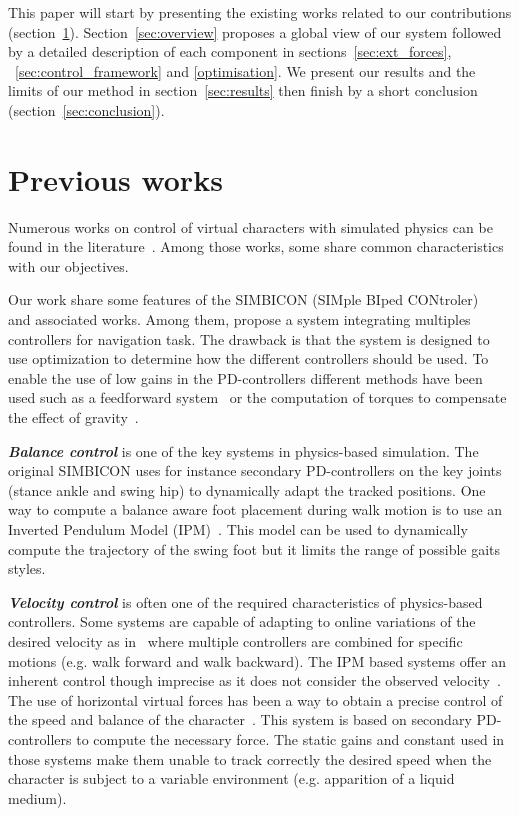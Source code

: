 \documentclass[conference]{acmsiggraph}
\begin{document}
This paper will start by presenting the existing works related to our contributions (section~\ref{sec:previous_works}). Section~\ref{sec:overview} proposes a global view of our system followed by a detailed description of each component in sections~\ref{sec:ext_forces}, ~\ref{sec:control_framework} and \ref{optimisation}. We present our results and the limits of our method in section~\ref{sec:results} then finish by a short conclusion (section~\ref{sec:conclusion}).
 
\section{Previous works}
\label{sec:previous_works}

Numerous works on control of virtual characters with simulated physics can be found in the literature~\cite{geijtenbeek2012interactive}. Among those works, some share common characteristics with our objectives.

Our work share some features of the SIMBICON (SIMple BIped CONtroler)~\cite{yin2007simbicon} and associated works. Among them, \cite{coros2009robust} propose a system integrating multiples controllers for navigation task. The drawback is that the system is designed to use optimization to determine how the different controllers should be used. To enable the use of low gains in the PD-controllers different methods have been used such as a feedforward system~\cite{yin2007simbicon} or the computation of torques to compensate the effect of gravity~\cite{coros2010generalized}.

\textbf{\textit{Balance control}} is one of the key systems in physics-based simulation. The original SIMBICON uses for instance secondary PD-controllers on the key joints (stance ankle and swing hip) to dynamically adapt the tracked positions. One way to compute a balance aware foot placement during walk motion is to use an Inverted Pendulum Model (IPM)~\cite{coros2010generalized,kajita20013d}. This model can be used to dynamically compute the trajectory of the swing foot but it limits the range of possible gaits styles.

\textbf{\textit{Velocity control}} is often one of the required characteristics of physics-based controllers. Some systems are capable of adapting to online variations of the desired velocity as in~\cite{coros2009robust} where multiple controllers are combined for specific motions (e.g. walk forward and walk backward). The IPM based systems offer an inherent control though imprecise as it does not consider the observed velocity~\cite{coros2010generalized}. The use of horizontal virtual forces has been a way to obtain a precise control of the speed and balance of the character~\cite{coros2010generalized,geijtenbeek2012simple}. This system is based on secondary PD-controllers to compute the necessary force. The static gains and constant used in those systems make them unable to track correctly the desired speed when the character is subject to a variable environment (e.g. apparition of a liquid medium). 
\end{document}
